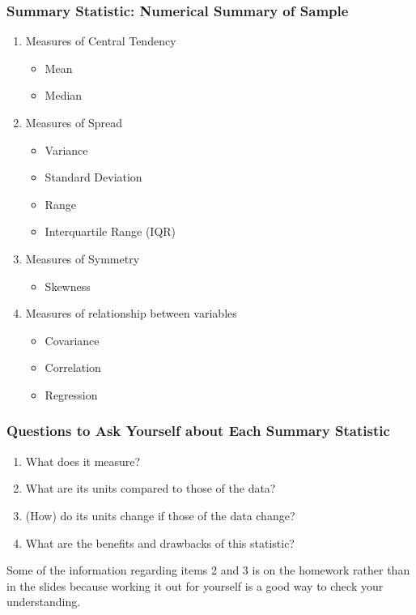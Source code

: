 \documentclass[handout]{beamer}
\begin{document}
\begin{frame}
\frametitle{Summary Statistic: Numerical Summary of Sample}
	\begin{enumerate}
\item Measures of Central Tendency
	\begin{itemize}
\item Mean
\item Median
\end{itemize}\pause
\item Measures of Spread
	\begin{itemize}
\item Variance
\item Standard Deviation
\item Range
\item Interquartile Range (IQR)
\end{itemize} \pause
\item Measures of Symmetry
	\begin{itemize}
		\item Skewness
	\end{itemize} \pause
\item Measures of relationship between variables 
	\begin{itemize}
\item Covariance
\item Correlation
\item Regression
\end{itemize}
\end{enumerate}
\end{frame}
\begin{frame}
\frametitle{Questions to Ask Yourself about Each Summary Statistic}
\begin{enumerate}
\item What does it measure?
\item What are its units compared to those of the data?
\item (How) do its units change if those of the data change?
\item What are the benefits and drawbacks of this statistic?
\end{enumerate}

\vspace{2em}
\alert{Some of the information regarding items 2 and 3 is on the homework rather than in the slides because working it out for yourself is a good way to check your understanding.}
\end{frame}
\end{document}

